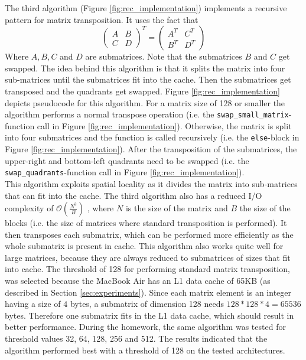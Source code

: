 \documentclass{scrartcl}
\begin{document}
    The third algorithm (Figure \ref{fig:rec_implementation}) implements a recursive pattern for matrix transposition. It uses the fact that 
    \begin{equation*}
        \begin{pmatrix}
            A & B \\
            C & D
        \end{pmatrix}^T = 
        \begin{pmatrix}
            A^T & C^T \\
            B^T & D^T
        \end{pmatrix}
    \end{equation*}
    Where $A, B, C$ and $D$ are submatrices. Note that the submatrices $B$ and $C$ get swapped. The idea behind this algorithm is that it splits the matrix into four sub-matrices until the submatrices fit into the cache. Then the submatrices get transposed and the quadrants get swapped. Figure \ref{fig:rec_implementation} depicts pseudocode for this algorithm. For a matrix size of 128 or smaller the algorithm performs a normal transpose operation (i.e. the \lstinline{swap_small_matrix}-function call in Figure \ref{fig:rec_implementation}). Otherwise, the matrix is split into four submatrices and the function is called recursively (i.e. the \lstinline{else}-block in Figure \ref{fig:rec_implementation}). After the transposition of the submatrices, the upper-right and bottom-left quadrants need to be swapped (i.e. the \lstinline{swap_quadrants}-function call in Figure \ref{fig:rec_implementation}).\\
    This algorithm exploits spatial locality as it divides the matrix into sub-matrices that can fit into the cache. The third algorithm also has a reduced I/O complexity of $\mathcal{O}(\frac{N^2}{B})$ \cite{algorithmica}, where $N$ is the size of the matrix and $B$ the size of the blocks (i.e. the size of matrices where standard transposition is performed). It then transposes each submatrix, which can be performed more efficiently as the whole submatrix is present in cache. This algorithm also works quite well for large matrices, because they are always reduced to submatrices of sizes that fit into cache. The threshold of 128 for performing standard matrix transposition, was selected because the MacBook Air has an L1 data cache of 65KB (as described in Section \ref{sec:experiments}). Since each matrix element is an integer having a size of $4$ bytes, a submatrix of dimension 128 needs $128*128*4 = 65536$ bytes. Therefore one submatrix fits in the L1 data cache, which should result in better performance. During the homework, the same algorithm was tested for threshold values 32, 64, 128, 256 and 512. The results indicated that the algorithm performed best with a threshold of 128 on the tested architectures.
\end{document}

